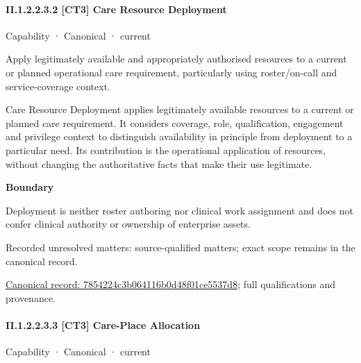 \paragraph*{II.1.2.2.3.2 [CT3] Care Resource Deployment}
\label{navigation:II.1.2.2.3.2}

\label{element:7854224c3b064116b0d48f01ce5537d8}
{\small Capability · Canonical · current}\par

Apply legitimately available and appropriately authorised resources to a current or planned operational care requirement, particularly using roster/on-call and service-coverage context.



Care Resource Deployment applies legitimately available resources to a current or planned care requirement. It considers coverage, role, qualification, engagement and privilege context to distinguish availability in principle from deployment to a particular need. Its contribution is the operational application of resources, without changing the authoritative facts that make their use legitimate.



\textbf{Boundary}



Deployment is neither roster authoring nor clinical work assignment and does not confer clinical authority or ownership of enterprise assets.


{\small Recorded unresolved matters: source-qualified matters; exact scope remains in the canonical record.}\par
{\footnotesize \href{../../../../continuum/strategy/capability/7854224c3b064116b0d48f01ce5537d8.md}{Canonical record: 7854224c3b064116b0d48f01ce5537d8}; full qualifications and provenance.}\par
\paragraph*{II.1.2.2.3.3 [CT3] Care-Place Allocation}
\label{navigation:II.1.2.2.3.3}

\label{element:f8a4df47bea742a0869802472136d55f}
{\small Capability · Canonical · current}\par

